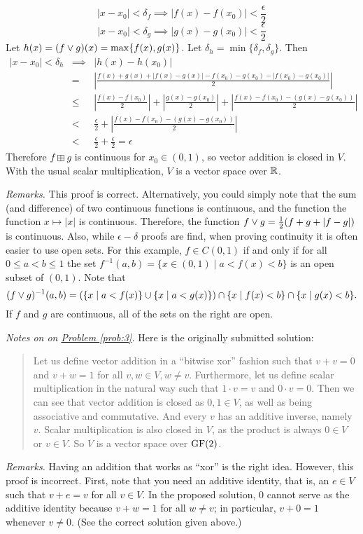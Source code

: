 $$ |x - x_0| < \delta_f \implies |f(x)-f(x_0)| < \frac{\epsilon}{2}$$ $$|x - x_0| < \delta_g \implies |g(x)-g(x_0)| < \frac{\epsilon}{2}$$
Let $h(x) = (f\vee g)(x) = \max\{f(x),g(x)\}$. Let $\delta_h = \min\{\delta_f,\delta_g\}$. Then
\begin{eqnarray*}
|x - x_0| < \delta_h & \implies & |h(x) - h(x_0)| \\ & = & \left|\frac{f(x)+g(x)+|f(x)-g(x)|-f(x_0)-g(x_0)-|f(x_0)-g(x_0)|}{2}\right| \\
& \leq & \left|\frac{f(x)-f(x_0)}{2}\right| + \left|\frac{g(x)-g(x_0)}{2}\right|
+ \left|\frac{f(x)-f(x_0)-(g(x)-g(x_0))}{2}\right| \\
& < & \frac{\epsilon}{2} + \left|\frac{f(x)-f(x_0)-(g(x)-g(x_0))}{2}\right| \\
& < & \frac{\epsilon}{2} + \frac{\epsilon}{2} = \epsilon
\end{eqnarray*}
Therefore $f \boxplus g$ is continuous for $x_0 \in (0,1)$, so vector addition is closed in $V$. With the usual scalar multiplication, $V$ is a vector space over $\mathbb{R}$.

{\it Remarks.} This proof is correct.  Alternatively, you could simply note that
the sum (and difference) of two continuous functions is continuous, and the
function the function $x \mapsto |x|$ is continuous.  Therefore, the function
$f \vee g = \frac{1}{2}(f+g+|f-g|)$ is continuous.  Also, while
$\epsilon-\delta$ proofs are find, when proving continuity it is often easier to
use open sets.  For this example, $f \in C(0,1)$ if and only if for all $0\leq a <
b \leq 1$ the set $f^{-1}(a, b) = \{x \in (0,1) \mid a< f(x) < b\}$ is an open
subset of $(0,1)$.  Note that  
\[
(f\vee g)^{-1}(a, b) =
\left(\{x \mid a< f(x)\}\cup \{x \mid a< g(x)\}\right) \cap
\{x \mid f(x)< b\} \cap \{x \mid g(x)<b\}.
\]
If $f$ and $g$ are continuous, all of the sets on the right are open.


{\it Notes on on \hyperref[prob:3]{Problem \ref*{prob:3}}.}
Here is the originally submitted solution:
\begin{quote}
Let us define vector addition in a ``bitwise xor'' fashion such that $v + v = 0$
and $v + w = 1$ for all $v,w \in V, w \neq v$. Furthermore, let us define scalar
multiplication in the natural way such that $1\cdot v = v$ and $0\cdot v = 0$.
Then we can see that vector addition is closed as $0,1 \in V$, as well as being
associative and commutative. And every $v$ has an additive inverse, namely
$v$. Scalar multiplication is also closed in $V$, as the product is always $0
\in V$ or $v \in V$. So $V$ is a vector space over $\operatorname{GF}(2)$.  
\end{quote}

{\it Remarks.} Having an addition that works as ``xor'' is the right idea.
However, this proof is incorrect.  First, note that you need an
additive identity, that is, an $e\in V$ such that $v + e = v$ for
all $v \in V$.  In the proposed solution, $0$ cannot serve as the additive identity
because $v+w = 1$ for all $w\neq v$; in particular, $v + 0 = 1$
whenever $v \neq 0$. (See the correct solution given above.)






